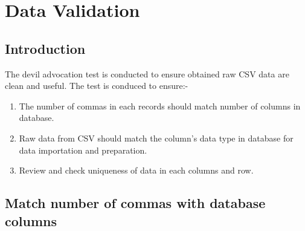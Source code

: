 \chapter{Data Validation} 
\label{AppendixB} 


\section{Introduction}
The devil advocation test is conducted to ensure obtained raw CSV data are clean and useful. The test is conduced to ensure:- 

\begin{enumerate}[topsep=0pt,itemsep=-1ex,partopsep=1ex,parsep=1.5ex]
	\item The number of commas in each records should match number of columns in database.
	\item Raw data from CSV should match the column's data type in database for data importation and preparation.
	\item Review and check uniqueness of data in each columns and row.
\end{enumerate}  

\pagebreak

\section{Match number of commas with database columns}

